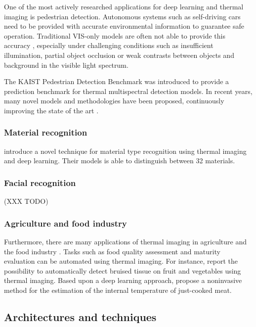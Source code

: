 \documentclass{l4proj}
\begin{document}
One of the most actively researched applications for deep learning and thermal imaging is pedestrian detection. Autonomous systems such as self-driving cars need to be provided with accurate environmental information to guarantee safe operation. Traditional VIS-only models are often not able to provide this accuracy \citep{zhang_how_2016}, especially under challenging conditions such as insufficient illumination, partial object occlusion or weak contrasts between objects and background in the visible light spectrum. 

The KAIST Pedestrian Detection Benchmark \citep{hwang_multispectral_2015} was introduced to provide a prediction benchmark for thermal multispectral detection models. In recent years, many novel models and methodologies have been proposed, continuously improving the state of the art \citep{konig_fully_2017}.

\subsubsection{Material recognition}

\citet{cho_deep_2018} introduce a novel technique for material type recognition using thermal imaging and deep learning. Their models is able to distinguish between 32 materials.

\subsubsection{Facial recognition}

(XXX TODO)
\citep{choi_thermal_2012}
\citep{sarfraz_deep_2017}

\subsubsection{Agriculture and food industry}

Furthermore, there are many applications of thermal imaging in agriculture and the food industry \citep{vadivambal_applications_2011}. Tasks such as food quality assessment and maturity evaluation can be automated using thermal imaging. For instance, \citet{gowen_applications_2010} report the possibility to automatically detect bruised tissue on fruit and vegetables using thermal imaging. Based upon a deep learning approach, \citet{ibarra_combined_2000} propose a noninvasive method for the estimation of the internal temperature of just-cooked meat. 


\subsection{Architectures and techniques}
\end{document}
